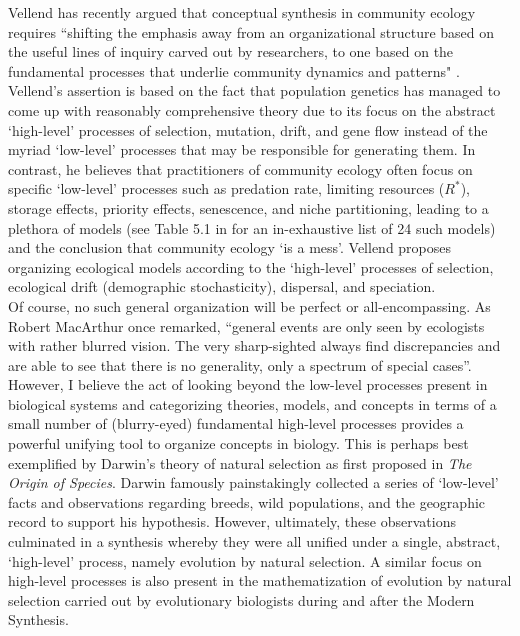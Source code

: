Vellend has recently argued that conceptual synthesis in community ecology requires ``shifting the emphasis away from an organizational structure based on the useful lines of inquiry carved out by researchers, to one based on the fundamental processes that underlie community dynamics and patterns" \citep{vellend_theory_2016}. Vellend's assertion is based on the fact that population genetics has managed to come up with reasonably comprehensive theory due to its focus on the abstract `high-level' processes of selection, mutation, drift, and gene flow instead of the myriad `low-level' processes that may be responsible for generating them. In contrast, he believes that practitioners of community ecology often focus on specific `low-level' processes such as predation rate, limiting resources ($R^*$), storage effects, priority effects, senescence, and niche partitioning, leading to a plethora of models (see Table 5.1 in \citep{vellend_theory_2016} for an in-exhaustive list of 24 such models) and the conclusion that community ecology `is a mess'. Vellend proposes organizing ecological models according to the `high-level' processes of selection, ecological drift (demographic stochasticity), dispersal, and speciation.\\ Of course, no such general organization will be perfect or all-encompassing. As Robert MacArthur once remarked, ``general events are only seen by ecologists with rather blurred vision. The very sharp-sighted always find discrepancies and are able to see that there is no generality, only a spectrum of special cases”\citep{kingsland_modeling_1985}. However, I believe the act of looking beyond the low-level processes present in biological systems and categorizing theories, models, and concepts in terms of a small number of (blurry-eyed) fundamental high-level processes provides a powerful unifying tool to organize concepts in biology. This is perhaps best exemplified by Darwin’s theory of natural selection as first proposed in \emph{The Origin of Species}. Darwin famously painstakingly collected a series of ‘low-level’ facts and observations regarding breeds, wild populations, and the geographic record to support his hypothesis. However, ultimately, these observations culminated in a synthesis whereby they were all unified under a single, abstract, ‘high-level’ process, namely evolution by natural selection. A similar focus on high-level processes is also present in the mathematization of evolution by natural selection carried out by evolutionary biologists during and after the Modern Synthesis.

